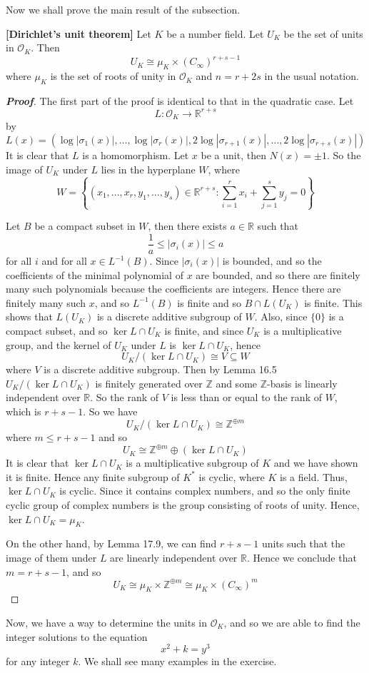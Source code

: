 Now we shall prove the main result of the subsection.
\begin{theorem}{\bf [Dirichlet's unit theorem]}\label{D;Dirichlet's unit theorem} Let $K$ be a number field.
Let $U_K$ be the set of units in $\mathcal{O}_K$. Then
$$U_K \cong \mu_K \times (C_\infty)^{r+s-1}$$
where $\mu_K$ is the set of roots of unity in $\mathcal{O}_K$ and $n=r+2s$ in the usual notation.
\end{theorem}
\begin{proof}[\bf Proof] The first part of the proof is identical to that in the quadratic case. Let
$$L: \mathcal{O}_K \rightarrow \mathbb{R}^{r+s}$$
by
$$L(x)=(\log{|\sigma_1(x)|},\ldots,\log{|\sigma_r(x)|},2\log{|\sigma_{r+1}(x)|},\ldots,2\log{|\sigma_{r+s}(x)|})$$
It is clear that $L$ is a homomorphism. Let $x$ be a unit, then $N(x)=\pm 1$. So the image of $U_K$ under $L$
lies in the hyperplane $W$, where
$$W=\left\{(x_1,\ldots,x_r,y_1,\ldots,y_s) \in \mathbb{R}^{r+s}: \sum_{i=1}^r x_i+\sum_{j=1}^s y_j=0\right\}$$

Let $B$ be a compact subset in $W$, then there exists $a \in \mathbb{R}$ such that
$$\frac{1}{a} \le |\sigma_i(x)| \le a$$
for all $i$ and for all $x \in L^{-1}(B)$. Since $|\sigma_i(x)|$ is bounded, and so the coefficients of the
minimal polynomial of $x$ are bounded, and so there are finitely many such polynomials because the coefficients are integers. Hence there are finitely many such $x$, and so $L^{-1}(B)$ is finite and so $B \cap L(U_K)$ is finite.
This shows that $L(U_K)$ is a discrete additive subgroup of $W$. Also, since
$\{0\}$ is a compact subset, and so $\ker{L} \cap U_K$ is finite, and since $U_K$ is a multiplicative group,
and the kernel of $U_K$ under $L$ is $\ker{L} \cap U_K$, hence
$$U_K/(\ker{L} \cap U_K) \cong V \subseteq W$$
where $V$ is a discrete additive subgroup. Then by Lemma 16.5 $U_K/(\ker{L} \cap U_K)$ is finitely generated
over $\mathbb{Z}$ and some $\mathbb{Z}$-basis is linearly independent over $\mathbb{R}$. So the rank of $V$
is less than or equal to the rank of $W$, which is $r+s-1$.
So we have
$$U_K/(\ker{L} \cap U_K) \cong \mathbb{Z}^{\oplus m}$$
where $m \le r+s-1$ and so
$$U_K \cong \mathbb{Z}^{\oplus m} \oplus (\ker{L} \cap U_K)$$
It is clear that $\ker{L} \cap U_K$ is a multiplicative subgroup of $K$ and we have shown it is finite. Hence any
finite subgroup of $K^*$ is cyclic, where $K$ is a field. Thus, $\ker{L} \cap U_K$ is cyclic. Since
it contains complex numbers, and so the only finite cyclic group of complex numbers is the group consisting of
roots of unity. Hence, $\ker{L} \cap U_K=\mu_K$.

On the other hand, by Lemma 17.9, we can find $r+s-1$ units such that the image of them under $L$ are linearly independent over $\mathbb{R}$. Hence we conclude that $m=r+s-1$, and so
$$U_K \cong \mu_K \times \mathbb{Z}^{\oplus m} \cong \mu_K \times (C_\infty)^m$$
\end{proof}
Now, we have a way to determine the units in $\mathcal{O}_K$, and so we are able to find the integer solutions to the equation
$$x^2+k=y^3$$
for any integer $k$. We shall see many examples in the exercise.

